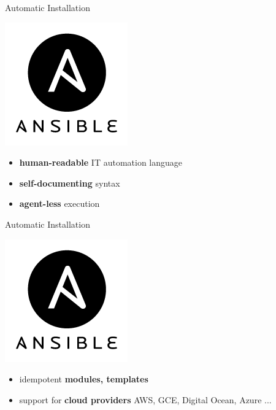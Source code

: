 \documentclass[12pt]{beamer}
\begin{document}
\begin{frame}{Automatic Installation}
	\begin{center}
		\includegraphics[keepaspectratio=true,height=0.4\textheight]{images/ansible.png}
	\end{center}
	\begin{itemize}
		\item \textbf{human-readable} IT automation language
		\item \textbf{self-documenting} syntax
		\item \textbf{agent-less} execution
	\end{itemize}
\end{frame}

\begin{frame}{Automatic Installation}
	\begin{center}
		\includegraphics[keepaspectratio=true,height=0.4\textheight]{images/ansible.png}
	\end{center}
	\begin{itemize}
		\item idempotent \textbf{modules, templates}
		\item support for \textbf{cloud providers} AWS, GCE, Digital Ocean, Azure ...
	\end{itemize}
\end{frame}
\end{document}
